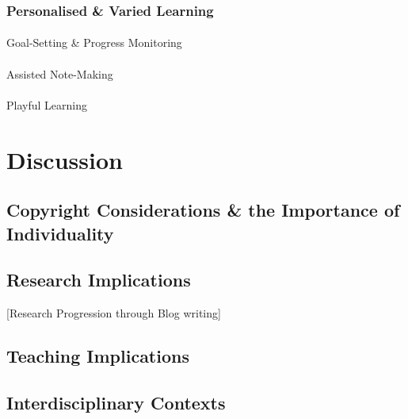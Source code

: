 \documentclass[
  british,
]{article}
\makeatletter
\let\oldparagraph\paragraph
\renewcommand{\paragraph}{
    \@ifstar
      \xxxParagraphStar
      \xxxParagraphNoStar
  }
\newcommand{\xxxParagraphStar}[1]{\oldparagraph*{#1}\mbox{}}
\newcommand{\xxxParagraphNoStar}[1]{\oldparagraph{#1}\mbox{}}
\makeatother
\begin{document}
\subsubsection{Personalised \& Varied
Learning}\label{personalised-varied-learning}

\paragraph{Goal-Setting \& Progress
Monitoring}\label{goal-setting-progress-monitoring}

\paragraph{Assisted Note-Making}\label{assisted-note-making}

\paragraph{Playful Learning}\label{playful-learning}

\section{Discussion}\label{discussion}

\subsection{Copyright Considerations \& the Importance of
Individuality}\label{copyright-considerations-the-importance-of-individuality}

\subsection{Research Implications}\label{research-implications}

{[}Research Progression through Blog writing{]}

\subsection{Teaching Implications}\label{teaching-implications}

\subsection{Interdisciplinary
Contexts}\label{interdisciplinary-contexts}
\end{document}
